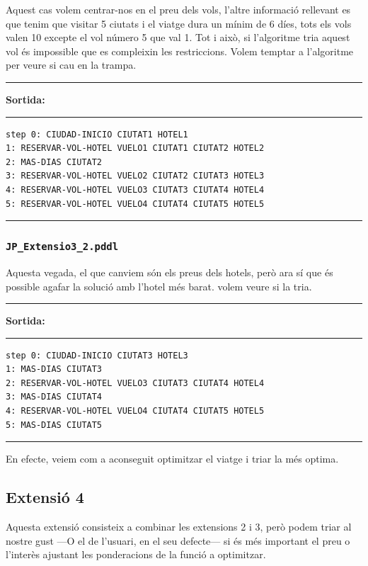 \documentclass[11pt,a4paper]{article}
\begin{document}
Aquest cas volem centrar-nos en el preu dels vols, l'altre informació rellevant es que tenim que visitar 5 ciutats i el viatge dura un mínim de 6 díes, tots els vols valen 10 excepte el vol número 5 que val 1. Tot i això, si l'algoritme tria aquest vol és impossible que es compleixin les restriccions. Volem temptar a l'algoritme per veure si cau en la trampa.

\begin{samepage}
\medskip
\noindent
\rule{0.1\textwidth}{0.5mm}
\textbf{Sortida:}
\rule{0.76\textwidth}{0.5mm}
\begin{verbatim}
step 0: CIUDAD-INICIO CIUTAT1 HOTEL1
1: RESERVAR-VOL-HOTEL VUELO1 CIUTAT1 CIUTAT2 HOTEL2
2: MAS-DIAS CIUTAT2
3: RESERVAR-VOL-HOTEL VUELO2 CIUTAT2 CIUTAT3 HOTEL3
4: RESERVAR-VOL-HOTEL VUELO3 CIUTAT3 CIUTAT4 HOTEL4
5: RESERVAR-VOL-HOTEL VUELO4 CIUTAT4 CIUTAT5 HOTEL5
\end{verbatim}
\rule{\textwidth}{0.5mm}
\medskip
\end{samepage}

\subsubsection*{\texttt{JP\_Extensio3\_2.pddl}}

Aquesta vegada, el que canviem són els preus dels hotels, però ara sí que és possible agafar la solució amb l'hotel més barat. volem veure si la tria.

\begin{samepage}
\medskip
\noindent
\rule{0.1\textwidth}{0.5mm}
\textbf{Sortida:}
\rule{0.76\textwidth}{0.5mm}
\begin{verbatim}
step 0: CIUDAD-INICIO CIUTAT3 HOTEL3
1: MAS-DIAS CIUTAT3
2: RESERVAR-VOL-HOTEL VUELO3 CIUTAT3 CIUTAT4 HOTEL4
3: MAS-DIAS CIUTAT4
4: RESERVAR-VOL-HOTEL VUELO4 CIUTAT4 CIUTAT5 HOTEL5
5: MAS-DIAS CIUTAT5
\end{verbatim}
\rule{\textwidth}{0.5mm}
\medskip
\end{samepage}

En efecte, veiem com a aconseguit optimitzar el viatge i triar la més optima.

\subsection{Extensió 4}

Aquesta extensió consisteix a combinar les extensions 2 i 3, però podem triar al nostre gust ---O el de l'usuari, en el seu defecte--- si és més important el preu o l'interès ajustant les ponderacions de la funció a optimitzar.
\end{document}
